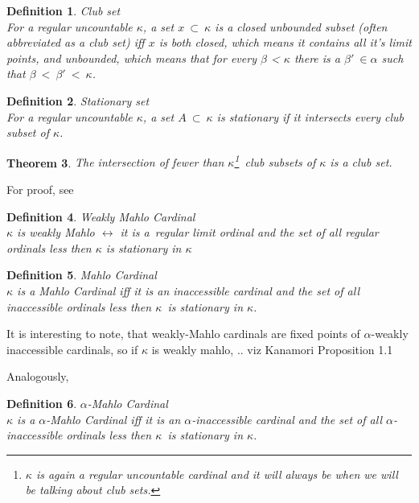 \documentclass[12pt,a4paper]{article}
\newtheorem{theorem}{Theorem}[section]
\newtheorem{definition}[theorem]{Definition}
\renewcommand{\iff}{\leftrightarrow}
\begin{document}
\begin{}
\begin{definition}{Club set}\\
For a regular uncountable $\kappa$, a set $x\ \subset\ \kappa$ is a \emph{closed unbounded} subset (often abbreviated as a \emph{club set}) iff $x$ is both closed, which means it contains all it's limit points, and unbounded, which means that for every $\beta$ < $\kappa$ there is a $\beta'\ \in \alpha$ such that $\beta\ <\ \beta'\ <\ \kappa$.
\end{definition}

\begin{definition}{Stationary set}\\
For a regular uncountable $\kappa$, a set $A\ \subset\ \kappa$ is stationary if it intersects every club subset of $\kappa$.
\end{definition}

\begin{theorem}{}\label{club_intersection} 
The intersection of fewer than $\kappa$\footnote{$\kappa$ is again a regular uncountable cardinal and it will always be when we will be talking about club sets.} club subsets of $\kappa$ is a club set.
\end{theorem}
For proof, see \cite[Theorem 8.3]{JechBook}

\begin{definition}{Weakly Mahlo Cardinal}\label{def:weakly_mahlo}\\
$\kappa$ is \emph{weakly Mahlo} $\iff$ it is a~regular limit ordinal and the set of all regular ordinals less then $\kappa$ is stationary in $\kappa$
\end{definition}

\begin{definition}{Mahlo Cardinal}\label{def:mahlo_cardinal}\\
$\kappa$ is a \emph{Mahlo Cardinal} iff it is an inaccessible cardinal and the set of all inaccessible ordinals less then $\kappa$ is stationary in $\kappa$.
\end{definition}
It is interesting to note, that weakly-Mahlo cardinals are fixed points of $\alpha$-weakly inaccessible cardinals, so if $\kappa$ is weakly mahlo,  .. viz Kanamori Proposition 1.1

Analogously, 
\begin{definition}{$\alpha$-Mahlo Cardinal}\label{def:alpha_mahlo_cardinal}\\
$\kappa$ is a \emph{$\alpha$-Mahlo Cardinal} iff it is an $\alpha$-inaccessible cardinal and the set of all $\alpha$-inaccessible ordinals less then $\kappa$ is stationary in $\kappa$.
\end{definition}


\end{}
\end{document}
